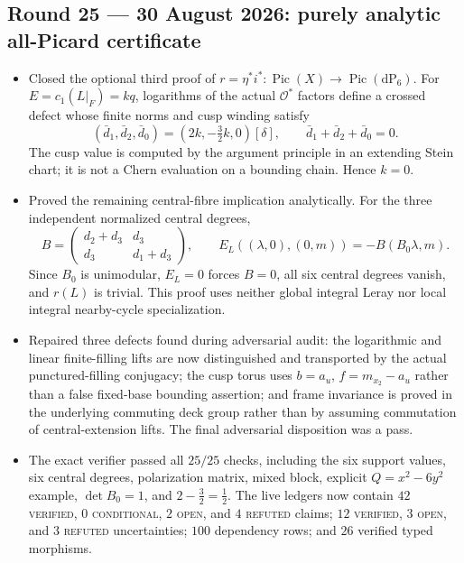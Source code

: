 \subsection*{Round 25 --- 30 August 2026: purely analytic all-Picard certificate}

\begin{itemize}[leftmargin=1.8em]
\item Closed the optional third proof of
\(r=\eta^*i^*:\operatorname{Pic}(X)\to\operatorname{Pic}(\mathrm{dP}_6)\).
For $E=c_1(L|_F)=kq$, logarithms of the actual $\mathcal O^*$ factors define
a crossed defect whose finite norms and cusp winding satisfy
\[
 (\bar d_1,\bar d_2,\bar d_0)
   =(2k,-\tfrac32k,0)[\delta],
 \qquad
 \bar d_1+\bar d_2+\bar d_0=0.
\]
The cusp value is computed by the argument principle in an extending Stein
chart; it is not a Chern evaluation on a bounding chain.  Hence $k=0$.
\item Proved the remaining central-fibre implication analytically.  For the
three independent normalized central degrees,
\[
 B=\begin{pmatrix}d_2+d_3&d_3\\d_3&d_1+d_3\end{pmatrix},
 \qquad
 E_L((\lambda,0),(0,m))=-B(B_0\lambda,m).
\]
Since $B_0$ is unimodular, $E_L=0$ forces $B=0$, all six central degrees
vanish, and $r(L)$ is trivial.  This proof uses neither global integral
Leray nor local integral nearby-cycle specialization.
\item Repaired three defects found during adversarial audit: the logarithmic
and linear finite-filling lifts are now distinguished and transported by the
actual punctured-filling conjugacy; the cusp torus uses
$b=a_u$, $f=m_{x_2}-a_u$ rather than a false fixed-base bounding assertion;
and frame invariance is proved in the underlying commuting deck group rather
than by assuming commutation of central-extension lifts.  The final
adversarial disposition was a pass.
\item The exact verifier passed all $25/25$ checks, including the six support
values, six central degrees, polarization matrix, mixed block, explicit
$Q=x^2-6y^2$ example, $\det B_0=1$, and
$2-\tfrac32=\tfrac12$.  The live ledgers now contain $42$ \textsc{verified},
$0$ \textsc{conditional}, $2$ \textsc{open}, and $4$ \textsc{refuted}
claims; $12$ \textsc{verified}, $3$ \textsc{open}, and $3$ \textsc{refuted}
uncertainties; $100$ dependency rows; and $26$ verified typed morphisms.
\end{itemize}

